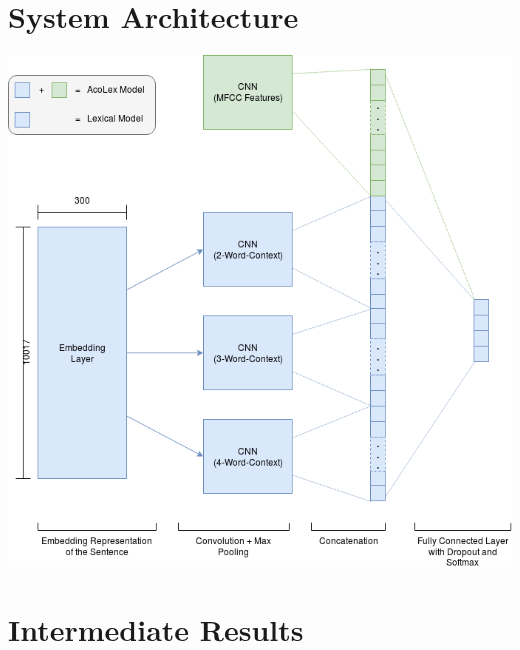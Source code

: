\documentclass[a0,landscape]{a0poster}
\begin{document}
\begin{multicols}{3}

\section*{System Architecture}
\includegraphics[width=0.9\linewidth]{Bilder/CNN_Diagram.png}


\color{Black} %
\large

\section*{Intermediate Results}

\begin{tabular}{c | c | c | c | c | c | c }
	

\end{tabular}
\end{multicols}
\end{document}
